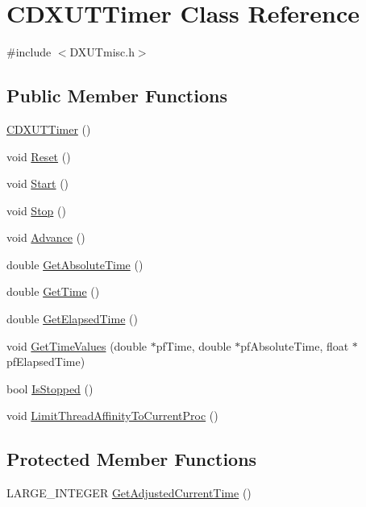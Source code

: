 \hypertarget{class_c_d_x_u_t_timer}{
\section{CDXUTTimer Class Reference}
\label{class_c_d_x_u_t_timer}
}


{\ttfamily \#include $<$DXUTmisc.h$>$}\subsection*{Public Member Functions}
\begin{DoxyCompactItemize}
\item 
\hyperlink{class_c_d_x_u_t_timer_ac5c3ca2e7b862f4283ecbe9fd749d906}{CDXUTTimer} ()
\item 
void \hyperlink{class_c_d_x_u_t_timer_adc40e951f6157dc82883294a19f8e04b}{Reset} ()
\item 
void \hyperlink{class_c_d_x_u_t_timer_a970f9d5dc0b3b84f6445ec756c188f4b}{Start} ()
\item 
void \hyperlink{class_c_d_x_u_t_timer_a6e0b8b06ade854d7bc8f190cee75de11}{Stop} ()
\item 
void \hyperlink{class_c_d_x_u_t_timer_a1a40a2b93164867f6d895b755a6e2938}{Advance} ()
\item 
double \hyperlink{class_c_d_x_u_t_timer_a0a742c4999a06c61c8558f58ef9211ce}{GetAbsoluteTime} ()
\item 
double \hyperlink{class_c_d_x_u_t_timer_a48c372d2d7ba669872d4a77d46aec33b}{GetTime} ()
\item 
double \hyperlink{class_c_d_x_u_t_timer_a425d2ad814bcea3a2cef5518a98168f8}{GetElapsedTime} ()
\item 
void \hyperlink{class_c_d_x_u_t_timer_a1e8c30855b6baab4993edafba1cca65c}{GetTimeValues} (double $\ast$pfTime, double $\ast$pfAbsoluteTime, float $\ast$pfElapsedTime)
\item 
bool \hyperlink{class_c_d_x_u_t_timer_a97fbd0e9bbc85c7369df4b1556713751}{IsStopped} ()
\item 
void \hyperlink{class_c_d_x_u_t_timer_a0e07e5d07c8521dac1b8299c4271742e}{LimitThreadAffinityToCurrentProc} ()
\end{DoxyCompactItemize}
\subsection*{Protected Member Functions}
\begin{DoxyCompactItemize}
\item 
LARGE\_\-INTEGER \hyperlink{class_c_d_x_u_t_timer_ae3e30ee1953d922c42dae96088b5842f}{GetAdjustedCurrentTime} ()
\end{DoxyCompactItemize}
